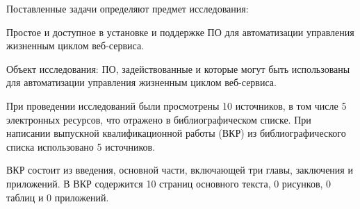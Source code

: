Поставленные задачи определяют предмет исследования:

Простое и доступное в установке и поддержке ПО для автоматизации управления жизненным циклом веб-сервиса.

Объект исследования: ПО, задействованные и которые могут быть использованы для автоматизации управления жизненным циклом веб-сервиса.

При проведении исследований были просмотрены 10 источников, в том числе 5 электронных ресурсов, что отражено в библиографическом списке.
При написании выпускной квалификационной работы (ВКР) из библиографического списка использовано 5 источников.

ВКР состоит из введения, основной части, включающей три главы, заключения и приложений.
В ВКР содержится 10 страниц основного текста, 0 рисунков, 0 таблиц и 0 приложений.